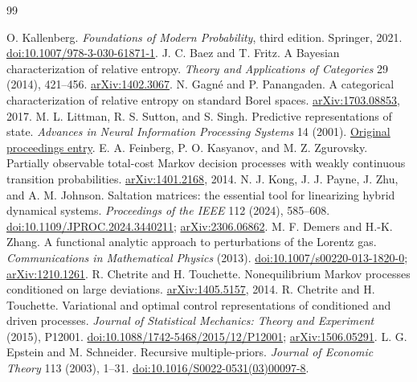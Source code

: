 \begin{thebibliography}{99}\raggedright
{} O. Kallenberg. \emph{Foundations of Modern Probability}, third edition. Springer, 2021. \href{https://doi.org/10.1007/978-3-030-61871-1}{doi:10.1007/978-3-030-61871-1}.
 J. C. Baez and T. Fritz. A Bayesian characterization of relative entropy. \emph{Theory and Applications of Categories} 29 (2014), 421--456. \href{https://arxiv.org/abs/1402.3067}{arXiv:1402.3067}.
 N. Gagn\'e and P. Panangaden. A categorical characterization of relative entropy on standard Borel spaces. \href{https://arxiv.org/abs/1703.08853}{arXiv:1703.08853}, 2017.
 M. L. Littman, R. S. Sutton, and S. Singh. Predictive representations of state. \emph{Advances in Neural Information Processing Systems} 14 (2001). \href{https://proceedings.neurips.cc/paper/2001/hash/1e4d36177d71bbb3558e43af9577d70e-Abstract.html}{Original proceedings entry}.
 E. A. Feinberg, P. O. Kasyanov, and M. Z. Zgurovsky. Partially observable total-cost Markov decision processes with weakly continuous transition probabilities. \href{https://arxiv.org/abs/1401.2168}{arXiv:1401.2168}, 2014.
 N. J. Kong, J. J. Payne, J. Zhu, and A. M. Johnson. Saltation matrices: the essential tool for linearizing hybrid dynamical systems. \emph{Proceedings of the IEEE} 112 (2024), 585--608. \href{https://doi.org/10.1109/JPROC.2024.3440211}{doi:10.1109/JPROC.2024.3440211}; \href{https://arxiv.org/abs/2306.06862}{arXiv:2306.06862}.
 M. F. Demers and H.-K. Zhang. A functional analytic approach to perturbations of the Lorentz gas. \emph{Communications in Mathematical Physics} (2013). \href{https://doi.org/10.1007/s00220-013-1820-0}{doi:10.1007/s00220-013-1820-0}; \href{https://arxiv.org/abs/1210.1261}{arXiv:1210.1261}.
 R. Chetrite and H. Touchette. Nonequilibrium Markov processes conditioned on large deviations. \href{https://arxiv.org/abs/1405.5157}{arXiv:1405.5157}, 2014.
 R. Chetrite and H. Touchette. Variational and optimal control representations of conditioned and driven processes. \emph{Journal of Statistical Mechanics: Theory and Experiment} (2015), P12001. \href{https://doi.org/10.1088/1742-5468/2015/12/P12001}{doi:10.1088/1742-5468/2015/12/P12001}; \href{https://arxiv.org/abs/1506.05291}{arXiv:1506.05291}.
 L. G. Epstein and M. Schneider. Recursive multiple-priors. \emph{Journal of Economic Theory} 113 (2003), 1--31. \href{https://doi.org/10.1016/S0022-0531(03)00097-8}{doi:10.1016/S0022-0531(03)00097-8}.

\end{thebibliography}
